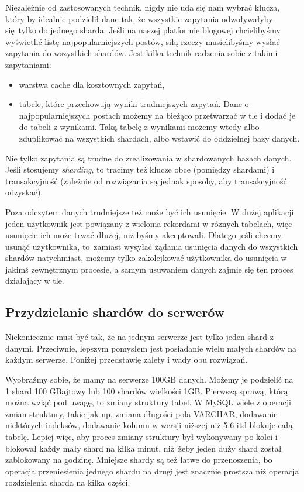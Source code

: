 \documentclass[a4paper,12pt]{article}
\begin{document}
Niezależnie od zastosowanych technik, nigdy nie uda się nam wybrać klucza, który by idealnie podzielił dane tak, że wszystkie zapytania odwoływałyby się tylko do jednego sharda. Jeśli na naszej platformie blogowej chcielibyśmy wyświetlić listę najpopularniejszych postów, siłą rzeczy musielibyśmy wysłać zapytania do wszystkich shardów. Jest kilka technik radzenia sobie z takimi zapytaniami:
\begin{itemize}
 \setlength{\itemsep}{0.06cm}
 \setlength{\parskip}{0.06cm}
 \item warstwa cache dla kosztownych zapytań,
 \item tabele, które przechowują wyniki trudniejszych zapytań. Dane o najpopularniejszych postach możemy na bieżąco przetwarzać w tle i dodać je do tabeli z wynikami. Taką tabelę z wynikami możemy wtedy albo zduplikować na wszystkich shardach, albo wstawić do oddzielnej bazy danych.
\end{itemize}

Nie tylko zapytania są trudne do zrealizowania w shardowanych bazach danych. Jeśli stosujemy \textit{sharding}, to tracimy też klucze obce (pomiędzy shardami) i transakcyjność (zależnie od rozwiązania są jednak sposoby, aby transakcyjność odzyskać).

Poza odczytem danych trudniejsze też może być ich usunięcie. W dużej aplikacji jeden użytkownik jest powiązany z wieloma rekordami w różnych tabelach, więc usunięcie ich może trwać dłużej, niż byśmy akceptowali. Dlatego jeśli chcemy usunąć użytkownika, to~zamiast wysyłać żądania usunięcia danych do wszystkich shardów natychmiast, możemy tylko zakolejkować użytkownika do usunięcia w jakimś zewnętrznym procesie, a samym usuwaniem danych zajmie się ten proces działający w tle.

\subsection{Przydzielanie shardów do serwerów}

Niekoniecznie musi być tak, że na jednym serwerze jest tylko jeden shard z danymi. Przeciwnie, lepszym pomysłem jest posiadanie wielu małych shardów na każdym serwerze. Poniżej przedstawię zalety i wady obu rozwiązań.

Wyobraźmy sobie, że mamy na serwerze 100GB danych. Możemy je podzielić na 1 shard 100 GBajtowy lub 100 shardów wielkości 1GB. Pierwszą sprawą, którą można wziąć pod uwagę, to zmiany struktury tabel. W MySQL wiele z operacji zmian struktury, takie jak np. zmiana długości pola VARCHAR, dodawanie niektórych indeksów, dodawanie kolumn w wersji niższej niż 5.6 itd blokuje całą tabelę. Lepiej więc, aby proces zmiany struktury był wykonywany po kolei i blokował każdy mały shard na kilka minut, niż żeby jeden duży shard został zablokowany na godzinę. Mniejsze shardy są też łatwe do przenoszenia, bo operacja przeniesienia jednego shardu na drugi jest znacznie prostsza niż operacja rozdzielenia sharda na kilka części.
\end{document}
